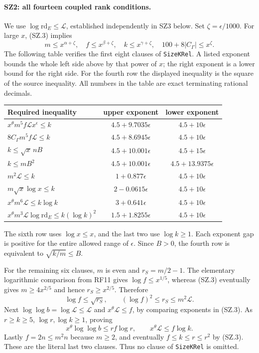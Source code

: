 \paragraph{SZ2: all fourteen coupled rank conditions.}
We use $\log\mathrm{rd}_E\leq\mathcal L$, established independently
in SZ3 below. Set $\zeta=\epsilon/1000$. For large $x$, (SZ.3)
implies
\[
 m\leq x^{\alpha+\zeta},\quad f\leq x^{\beta+\zeta},\quad
 k\leq x^{\gamma+\zeta},\quad
 100+8|C_\Gamma|\leq x^\zeta.                                 \tag{SZ.4}
\]
The following table verifies the first eight clauses of
\texttt{SizeKRel}. A listed exponent bounds the whole left side
above by that power of $x$; the right exponent is a lower bound for
the right side. For the fourth row the displayed inequality is the
square of the source inequality. All numbers in the table are exact
terminating rational decimals.
\begin{center}\small
\begin{tabular}{p{}cc}
Required inequality & upper exponent & lower exponent\\\hline
$x^\theta m^5f\mathcal L x^\epsilon\leq k$
 & $4.5+9.7035\epsilon$ & $4.5+10\epsilon$\\
$8C_\Gamma m^5f\mathcal L\leq k$
 & $4.5+8.6945\epsilon$ & $4.5+10\epsilon$\\
$k\leq\sqrt{x}\,nB$
 & $4.5+10.001\epsilon$ & $4.5+15\epsilon$\\
$k\leq mB^2$
 & $4.5+10.001\epsilon$ & $4.5+13.9375\epsilon$\\
$m^2\mathcal L\leq k$
 & $1+0.877\epsilon$ & $4.5+10\epsilon$\\
$m\sqrt{x}\log x\leq k$
 & $2-0.0615\epsilon$ & $4.5+10\epsilon$\\
$x^\theta m^6\mathcal L\leq k\log k$
 & $3+0.641\epsilon$ & $4.5+10\epsilon$\\
$x^\theta m^3\mathcal L\log\mathrm{rd}_E
                  \leq k(\log k)^2$
 & $1.5+1.8255\epsilon$ & $4.5+10\epsilon$
\end{tabular}
\end{center}
The sixth row uses $\log x\leq x$, and the last two use
$\log k\geq1$. Each exponent gap is positive for the entire allowed
range of $\epsilon$. Since $B>0$, the fourth row is equivalent to
$\sqrt{k/m}\leq B$.

For the remaining six clauses, $m$ is even and
$r_S=m/2-1$. The elementary logarithmic comparison from RF11 gives
$\log f\leq x^{1/5}$, whereas (SZ.3) eventually gives
$m\geq4x^{2/5}$ and hence $r_S\geq x^{2/5}$.
Therefore
\[
 \log f\leq\sqrt{r_S},\qquad
 (\log f)^2\leq r_S\leq m^2\mathcal L.
\]
Next $\log\log b=\log\mathcal L\leq\mathcal L$ and
$x^\theta\mathcal L\leq f$, by comparing exponents in (SZ.3).
As $r\geq k\geq5$, $\log r,\log k\geq1$, proving
\[
 x^\theta\log\log b\leq rf\log r,
       \qquad x^\theta\mathcal L\leq f\log k.
\]
Lastly $f=2n\leq m^2n$ because $m\geq2$, and eventually
$f\leq k\leq r\leq r^2$ by (SZ.3). These are the literal last two
clauses. Thus no clause of \texttt{SizeKRel} is omitted.

